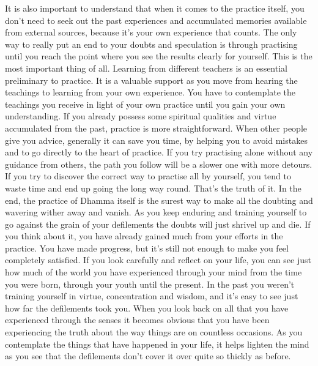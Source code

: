 It is also important to understand that when it comes to the practice itself, you don't need to seek out the past experiences and accumulated memories available from external sources, because it's your own experience that counts. The only way to really put an end to your doubts and speculation is through practising until you reach the point where you see the results clearly for yourself. This is the most important thing of all. Learning from different teachers is an essential preliminary to practice. It is a valuable support as you move from hearing the teachings to learning from your own experience. You have to contemplate the teachings you receive in light of your own practice until you gain your own understanding. If you already possess some spiritual qualities and virtue accumulated from the past, practice is more straightforward. When other people give you advice, generally it can save you time, by helping you to avoid mistakes and to go directly to the heart of practice. If you try practising alone without any guidance from others, the path you follow will be a slower one with more detours. If you try to discover the correct way to practise all by yourself, you tend to waste time and end up going the long way round. That's the truth of it. In the end, the practice of Dhamma itself is the surest way to make all the doubting and wavering wither away and vanish. As you keep enduring and training yourself to go against the grain of your defilements the doubts will just shrivel up and die. If you think about it, you have already gained much from your efforts in the practice. You have made progress, but it's still not enough to make you feel completely satisfied. If you look carefully and reflect on your life, you can see just how much of the world you have experienced through your mind from the time you were born, through your youth until the present. In the past you weren't training yourself in virtue, concentration and wisdom, and it's easy to see just how far the defilements took you. When you look back on all that you have experienced through the senses it becomes obvious that you have been experiencing the truth about the way things are on countless occasions. As you contemplate the things that have happened in your life, it helps lighten the mind as you see that the defilements don't cover it over quite so thickly as before.

